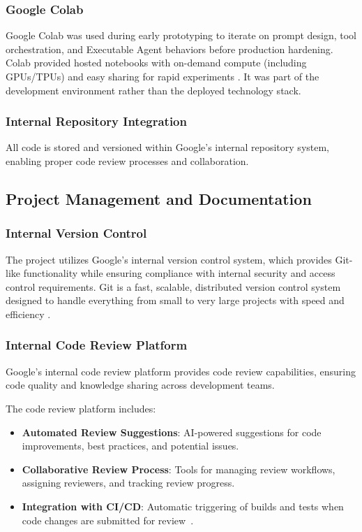 \begin{spacing}{1.2}
\subsubsection{Google Colab}
Google Colab was used during early prototyping to iterate on prompt design, tool orchestration, and Executable Agent behaviors before production hardening. Colab provided hosted notebooks with on-demand compute (including GPUs/TPUs) and easy sharing for rapid experiments \cite{colab2017, jupyter2014}. It was part of the development environment rather than the deployed technology stack.


\subsubsection{Internal Repository Integration}
All code is stored and versioned within Google's internal repository system, enabling proper code review processes and collaboration.

\subsection{Project Management and Documentation}

\subsubsection{Internal Version Control}
The project utilizes Google's internal version control system, which provides Git-like functionality while ensuring compliance with internal security and access control requirements. Git is a fast, scalable, distributed version control system designed to handle everything from small to very large projects with speed and efficiency \cite{git2005}.


\subsubsection{Internal Code Review Platform}
Google's internal code review platform provides code review capabilities, ensuring code quality and knowledge sharing across development teams.

The code review platform includes:
\begin{itemize}
    \item \textbf{Automated Review Suggestions}: AI-powered suggestions for code improvements, best practices, and potential issues.
    \item \textbf{Collaborative Review Process}: Tools for managing review workflows, assigning reviewers, and tracking review progress.
    \item \textbf{Integration with CI/CD}: Automatic triggering of builds and tests when code changes are submitted for review~\cite{ci_cd2010}.
\end{itemize}


\end{spacing}
